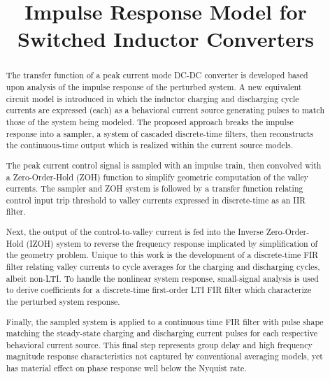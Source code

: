 \documentclass[conference]{IEEEtran}
\begin{document}
\title{Impulse Response Model for Switched Inductor Converters\\}

\author{
\and
{}
}


\maketitle

\begin{abstract}
The transfer function of a peak current mode DC-DC converter is developed based upon analysis of the impulse response of the perturbed system. A new equivalent circuit model is introduced in which the inductor charging and discharging cycle currents are expressed (each) as a behavioral current source generating pulses to match those of the system being modeled. The proposed approach breaks the impulse response into a sampler, a system of cascaded discrete-time filters, then reconstructs the continuous-time output which is realized within the current source models.  

The peak current control signal is sampled with an impulse train, then convolved with a Zero-Order-Hold (ZOH) function to simplify geometric computation of the valley currents. The sampler and ZOH system is followed by a transfer function relating control input trip threshold to valley currents expressed in discrete-time as an IIR filter.   

Next, the output of the control-to-valley current is fed into the Inverse Zero-Order-Hold (IZOH) system to reverse the frequency response implicated by simplification of the geometry problem.  Unique to this work is the development of a discrete-time FIR filter relating valley currents to cycle averages for the charging and discharging cycles, albeit non-LTI. To handle the nonlinear system response, small-signal analysis is used to derive coefficients for a discrete-time first-order LTI FIR filter which characterize the perturbed system response. 

Finally, the sampled system is applied to a continuous time FIR filter with pulse shape matching the steady-state charging and discharging current pulses for each respective behavioral current source.  This final step represents group delay and high frequency magnitude response characteristics not captured by conventional averaging models, yet has material effect on phase response well below the Nyquist rate.
\end{abstract}
\end{document}
